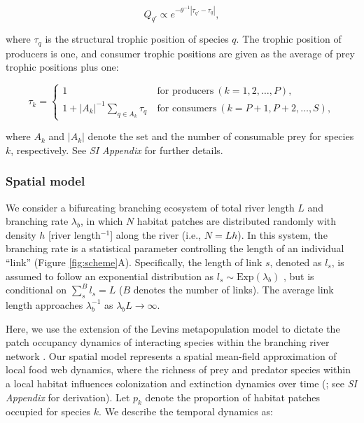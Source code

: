\documentclass[11pt, class=article, crop=false]{standalone}
\begin{document}
\begin{equation}
    Q_{q'} \propto e^{-\theta^{-1} |\tau_{q'} - \tau_q|},
\end{equation}

where $\tau_q$ is the structural trophic position of species $q$.
The trophic position of producers is one, and
consumer trophic positions are given as the average of prey trophic positions plus one:

\begin{equation}
    \tau_k = 
    \begin{cases}
    1 & ~\text{for producers}~ (k=1, 2, \ldots, P),\\
    1 + |A_{k}|^{-1} \sum_{q \in A_{k}} \tau_q & ~\text{for consumers}~ (k = P+1, P+2, \ldots, S),
    \end{cases}
\end{equation}

where $A_{k}$ and $|A_{k}|$ denote the set and the number of consumable prey for species $k$, respectively.
See \textit{SI Appendix} for further details.

\subsubsection{Spatial model}

We consider a bifurcating branching ecosystem of total river length $L$ and branching rate $\lambda_b$, in which $N$ habitat patches are distributed randomly with density $h$ [river length$^{-1}$] along the river (i.e., $N = Lh$).
In this system, the branching rate is a statistical parameter controlling the length of an individual ``link'' (Figure \ref{fig:scheme}A).
Specifically, the length of link $s$, denoted as $l_s$, is assumed to follow an exponential distribution as $l_s \sim \mbox{Exp}(\lambda_b)$ \citep{peckham_reformulation_1999, terui_metapopulation_2018, terui_emergent_2021}, but is conditional on $\sum_s^B l_s = L$ ($B$ denotes the number of links).
The average link length approaches $\lambda_b^{-1}$ as $\lambda_b L \rightarrow \infty$.

Here, we use the extension of the Levins metapopulation model to dictate the patch occupancy dynamics of interacting species within the branching river network \citep{calcagno_constraints_2011, takimoto_effects_2012, guo_towards_2023}.
Our spatial model represents a spatial mean-field approximation of local food web dynamics, where the richness of prey and predator species within a local habitat influences colonization and extinction dynamics over time (\citep{shibasaki_food_2024}; see \textit{SI Appendix} for derivation).
Let $p_k$ denote the proportion of habitat patches occupied for species $k$.
We describe the temporal dynamics as:
\end{document}
